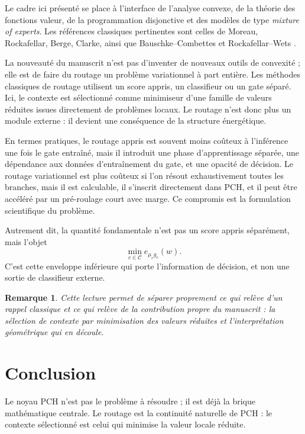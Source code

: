 \documentclass[11pt,a4paper]{article}
\newtheorem{remark}{Remarque}[section]
\newcommand{\Ccal}{\mathcal C}
\begin{document}
Le cadre ici présenté se place à l'interface de l'analyse convexe, de la théorie des fonctions valeur, de la programmation disjonctive et des modèles de type \emph{mixture of experts}. Les références classiques pertinentes sont celles de Moreau, Rockafellar, Berge, Clarke, ainsi que Bauschke--Combettes et Rockafellar--Wets \cite{Moreau1965,Rockafellar1970,Berge1963,Clarke1983,BauschkeCombettes2017,RockafellarWets1998}.

La nouveauté du manuscrit n'est pas d'inventer de nouveaux outils de convexité ; elle est de faire du routage un problème variationnel à part entière. Les méthodes classiques de routage utilisent un score appris, un classifieur ou un gate séparé. Ici, le contexte est sélectionné comme minimiseur d'une famille de valeurs réduites issues directement de problèmes locaux. Le routage n'est donc plus un module externe : il devient une conséquence de la structure énergétique.

En termes pratiques, le routage appris est souvent moins coûteux à l'inférence une fois le gate entraîné, mais il introduit une phase d'apprentissage séparée, une dépendance aux données d'entraînement du gate, et une opacité de décision. Le routage variationnel est plus coûteux si l'on résout exhaustivement toutes les branches, mais il est calculable, il s'inscrit directement dans PCH, et il peut être accéléré par un pré-roulage court avec marge. Ce compromis est la formulation scientifique du problème.

Autrement dit, la quantité fondamentale n'est pas un score appris séparément, mais l'objet
\[
\min_{c\in\Ccal} e_{\mu_c g_c}(w).
\]
C'est cette enveloppe inférieure qui porte l'information de décision, et non une sortie de classifieur externe.

\begin{remark}
Cette lecture permet de séparer proprement ce qui relève d'un rappel classique et ce qui relève de la contribution propre du manuscrit : la sélection de contexte par minimisation des valeurs réduites et l'interprétation géométrique qui en découle.
\end{remark}

\section{Conclusion}

Le noyau PCH n'est pas le problème à résoudre ; il est déjà la brique mathématique centrale. Le routage est la continuité naturelle de PCH : le contexte sélectionné est celui qui minimise la valeur locale réduite.
\end{document}
